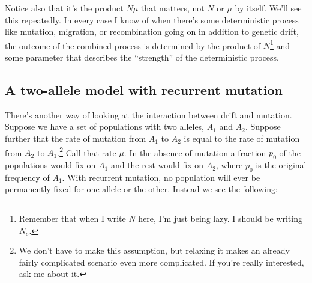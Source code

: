 \documentclass[12pt]{article}
\begin{document}
Notice also that it's the product $N\mu$ that matters, not $N$ or
$\mu$ by itself. We'll see this repeatedly. In every case I know of
when there's some deterministic process like mutation, migration, or
recombination going on in addition to genetic drift, the outcome of
the combined process is determined by the product of
$N$\footnote{Remember that when I write $N$ here, I'm just being
  lazy. I should be writing $N_e$.} and some parameter that describes
the ``strength'' of the deterministic process.

\subsection*{A two-allele model with recurrent mutation}

There's another way of looking at the interaction between drift and
mutation. Suppose we have a set of populations with two alleles, $A_1$
and $A_2$. Suppose further that the rate of mutation from $A_1$ to
$A_2$ is equal to the rate of mutation from $A_2$ to
$A_1$.\footnote{We don't have to make this assumption, but relaxing it
  makes an already fairly complicated scenario even more
  complicated. If you're really interested, ask me about it.} Call
that rate $\mu$. In the absence of mutation a fraction $p_0$ of the
populations would fix on $A_1$ and the rest would fix on $A_2$, where
$p_0$ is the original frequency of $A_1$. With recurrent mutation, no
population will ever be permanently fixed for one allele or the
other. Instead we see the following:

\begin{center}
\end{center}
\end{document}
